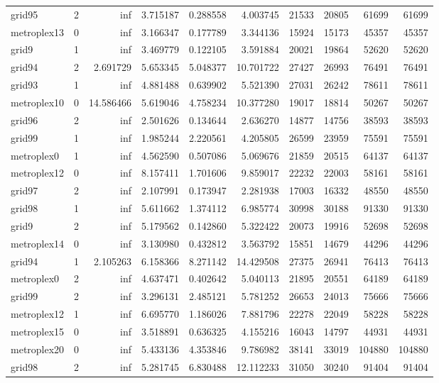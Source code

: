 \begin{longtable}{|l|r|r|r|r|r|r|r|r|r|}
grid95 & 2 & inf & 3.715187 & 0.288558 & 4.003745 & 21533 & 20805 & 61699 & 61699 \\
metroplex13 & 0 & inf & 3.166347 & 0.177789 & 3.344136 & 15924 & 15173 & 45357 & 45357 \\
grid9 & 1 & inf & 3.469779 & 0.122105 & 3.591884 & 20021 & 19864 & 52620 & 52620 \\
grid94 & 2 & 2.691729 & 5.653345 & 5.048377 & 10.701722 & 27427 & 26993 & 76491 & 76491 \\
grid93 & 1 & inf & 4.881488 & 0.639902 & 5.521390 & 27031 & 26242 & 78611 & 78611 \\
metroplex10 & 0 & 14.586466 & 5.619046 & 4.758234 & 10.377280 & 19017 & 18814 & 50267 & 50267 \\
grid96 & 2 & inf & 2.501626 & 0.134644 & 2.636270 & 14877 & 14756 & 38593 & 38593 \\
grid99 & 1 & inf & 1.985244 & 2.220561 & 4.205805 & 26599 & 23959 & 75591 & 75591 \\
metroplex0 & 1 & inf & 4.562590 & 0.507086 & 5.069676 & 21859 & 20515 & 64137 & 64137 \\
metroplex12 & 0 & inf & 8.157411 & 1.701606 & 9.859017 & 22232 & 22003 & 58161 & 58161 \\
grid97 & 2 & inf & 2.107991 & 0.173947 & 2.281938 & 17003 & 16332 & 48550 & 48550 \\
grid98 & 1 & inf & 5.611662 & 1.374112 & 6.985774 & 30998 & 30188 & 91330 & 91330 \\
grid9 & 2 & inf & 5.179562 & 0.142860 & 5.322422 & 20073 & 19916 & 52698 & 52698 \\
metroplex14 & 0 & inf & 3.130980 & 0.432812 & 3.563792 & 15851 & 14679 & 44296 & 44296 \\
grid94 & 1 & 2.105263 & 6.158366 & 8.271142 & 14.429508 & 27375 & 26941 & 76413 & 76413 \\
metroplex0 & 2 & inf & 4.637471 & 0.402642 & 5.040113 & 21895 & 20551 & 64189 & 64189 \\
grid99 & 2 & inf & 3.296131 & 2.485121 & 5.781252 & 26653 & 24013 & 75666 & 75666 \\
metroplex12 & 1 & inf & 6.695770 & 1.186026 & 7.881796 & 22278 & 22049 & 58228 & 58228 \\
metroplex15 & 0 & inf & 3.518891 & 0.636325 & 4.155216 & 16043 & 14797 & 44931 & 44931 \\
metroplex20 & 0 & inf & 5.433136 & 4.353846 & 9.786982 & 38141 & 33019 & 104880 & 104880 \\
grid98 & 2 & inf & 5.281745 & 6.830488 & 12.112233 & 31050 & 30240 & 91404 & 91404 \\

\end{longtable}
